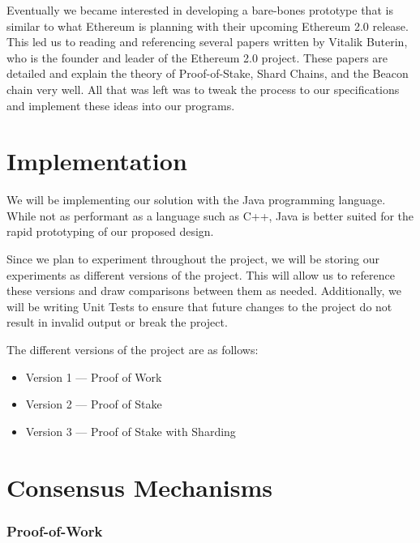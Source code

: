 Eventually we became interested in developing a bare-bones prototype that is similar to what Ethereum is planning with their upcoming Ethereum 2.0 release. This led us to reading and referencing several papers written by Vitalik Buterin, who is the founder and leader of the Ethereum 2.0 project. These papers are detailed and explain the theory of Proof-of-Stake, Shard Chains, and the Beacon chain very well. All that was left was to tweak the process to our specifications and implement these ideas into our programs.

\section{Implementation}

We will be implementing our solution with the Java programming language. While not as performant as a language such as C++, Java is better suited for the rapid prototyping of our proposed design.

Since we plan to experiment throughout the project, we will be storing our experiments as different versions of the project. This will allow us to reference these versions and draw comparisons between them as needed.
Additionally, we will be writing Unit Tests to ensure that future changes to the project do not result in invalid output or break the project.

The different versions of the project are as follows:
  \begin{itemize}
    \item Version 1 — Proof of Work
    \item Version 2 — Proof of Stake
    \item Version 3 — Proof of Stake with Sharding
  \end{itemize}
 

\section{Consensus Mechanisms}

\subsubsection{Proof-of-Work}

